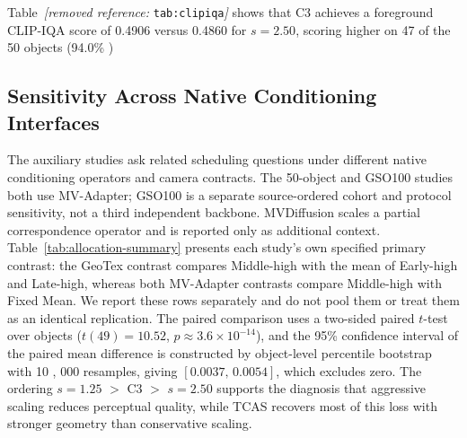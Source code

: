 \documentclass[times,twocolumn,final]{elsarticle}
\providecommand{\DIFadd}[1]{{\protect\color{blue} \sf #1}} %
\providecommand{\DIFdel}[1]{{\protect\color{red} \scriptsize #1}} %
\providecommand{\DIFaddbegin}{} %
\providecommand{\DIFaddend}{} %
\providecommand{\DIFdelbegin}{} %
\providecommand{\DIFdelend}{} %
\begin{document}
\DIFdel{Table~\textit{[removed reference: }\texttt{tab:clipiqa}\textit{]} shows that C3 achieves a foreground CLIP-IQA score of 0.4906 versus 0.4860 for $s = 2.50$, scoring higher on 47 of the 50 objects (94.0\% )}\DIFdelend \DIFaddbegin \subsection{Sensitivity Across Native Conditioning Interfaces}
\label{subsec:cross-interface}
\DIFadd{The auxiliary studies ask related scheduling questions under different native conditioning operators and camera contracts. The 50-object and GSO100 studies both use MV-Adapter; GSO100 is a separate source-ordered cohort and protocol sensitivity, not a third independent backbone. MVDiffusion scales a partial correspondence operator and is reported only as additional context. Table~\ref{tab:allocation-summary} presents each study's own specified primary contrast: the GeoTex contrast compares Middle-high with the mean of Early-high and Late-high, whereas both MV-Adapter contrasts compare Middle-high with Fixed Mean. We report these rows separately and do not pool them or treat them as an identical replication}\DIFaddend .
\DIFdelbegin \DIFdel{The paired comparison uses a two-sided paired $t$-test over objects ($t(49)=10.52$, $p\approx3.6\times10^{-14}$), and the 95\% confidence interval of the paired mean difference is constructed by object-level percentile bootstrap with 10}%
\DIFdel{,}%
\DIFdel{000 resamples, giving $[0.0037,\,0.0054]$, which excludes zero. The ordering $s = 1.25$ $>$ C3 $>$ $s = 2.50$ supports the diagnosis that aggressive scaling reduces perceptual quality, while TCAS recovers most of this loss with stronger geometry than conservative scaling.
}\DIFdelend
\end{document}
